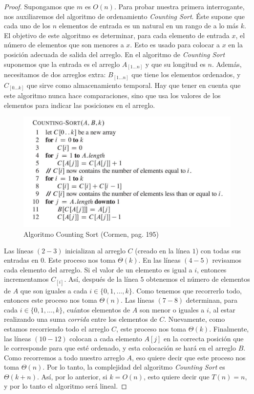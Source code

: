 \documentclass[letterpaper,11pt]{article}
\begin{document}
\begin{enumerate}
    \begin{proof}
        Supongamos que $m$ es $O(n)$. Para probar nuestra primera interrogante,
        nos auxiliaremos del algoritmo de ordenamiento \textit{Counting Sort}.
        Éste supone que cada uno de los $n$ elementos de entrada es un natural
        en un rango de a lo más $k$. El objetivo de este algoritmo es 
        determinar, para cada elemento de entrada $x$, el número de elementos 
        que son menores a $x$. Esto es usado para colocar a $x$ en la posición 
        adecuada de salida del arreglo. En el algoritmo de \textit{Counting 
        Sort} suponemos que la entrada es el arreglo $A_{[1...n]}$ y que su 
        longitud es $n$. Además, necesitamos de dos arreglos extra: 
        $B_{[1...n]}$ que tiene los elementos ordenados, y $C_{[0...k]}$ que 
        sirve como almacenamiento temporal. Hay que tener en cuenta que este 
        algoritmo nunca hace comparaciones, sino que usa los valores de los 
        elementos para indicar las posiciones en el arreglo.

        \begin{figure}[h]
            \centering
            \includegraphics[width=0.55\linewidth]
            {imagenes/counting-sort-normal.jpeg}
            \caption{Algoritmo Counting Sort (Cormen, pag. 195)}
            \label{fig:counting-sort-normal}
        \end{figure}

        Las líneas $(2 - 3)$ inicializan al arreglo $C$ (creado en la línea $1$)
        con todas sus entradas en $0$. Este proceso nos toma $\Theta(k)$. En las 
        líneas $(4 - 5)$ revisamos cada elemento del arreglo. Si el valor de 
        un elemento es igual a $i$, entonces incrementamos $C_{[i]}$. Así, 
        después de la línea $5$ obtenemos el número de elementos de $A$ que son 
        iguales a cada $i \in \{0, 1, ..., k\}$. Como tenemos que recorrerlo 
        todo, entonces este proceso nos toma $\Theta(n)$. Las líneas $(7 - 8)$ 
        determinan, para cada $i \in \{0, 1, ..., k\}$, cuántos elementos de 
        $A$ son menor o iguales a $i$, al estar realizando una suma 
        \textit{corrida} entre los elementos de $C$. Nuevamente, como estamos 
        recorriendo todo el arreglo $C$, este proceso nos toma $\Theta(k)$. 
        Finalmente, las líneas $(10 - 12)$ colocan a cada elemento $A[j]$ en 
        la correcta posición que le corresponde para que esté ordenado, y esta 
        colocación se hará en el arreglo $B$. Como recorremos a todo nuestro
        arreglo $A$, eso quiere decir que este proceso nos toma $\Theta(n)$. 
        Por lo tanto, la complejidad del algoritmo \textit{Counting Sort} es 
        $\Theta(k + n)$. Así, por lo anterior, si $k = O(n)$, esto quiere 
        decir que $T(n) = n$, y por lo tanto el algoritmo será lineal. 


\end{proof}
\end{enumerate}
\end{document}
